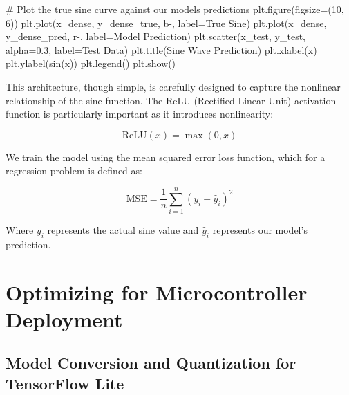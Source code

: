 \documentclass[
  9pt,
  letterpaper,
  abstract,
  titlepage]{scrbook}
\newenvironment{Shaded}{\begin{snugshade}}{\end{snugshade}}
\newcommand{\CommentTok}[1]{\textcolor[rgb]{0.37,0.37,0.37}{#1}}
\newcommand{\DecValTok}[1]{\textcolor[rgb]{0.68,0.00,0.00}{#1}}
\newcommand{\FloatTok}[1]{\textcolor[rgb]{0.68,0.00,0.00}{#1}}
\newcommand{\NormalTok}[1]{\textcolor[rgb]{0.00,0.23,0.31}{#1}}
\newcommand{\OperatorTok}[1]{\textcolor[rgb]{0.37,0.37,0.37}{#1}}
\newcommand{\StringTok}[1]{\textcolor[rgb]{0.13,0.47,0.30}{#1}}
\begin{document}
\begin{Shaded}
\begin{Highlighting}[]
\CommentTok{\# Plot the true sine curve against our model\textquotesingle{}s predictions}
\NormalTok{plt.figure(figsize}\OperatorTok{=}\NormalTok{(}\DecValTok{10}\NormalTok{, }\DecValTok{6}\NormalTok{))}
\NormalTok{plt.plot(x\_dense, y\_dense\_true, }\StringTok{\textquotesingle{}b{-}\textquotesingle{}}\NormalTok{, label}\OperatorTok{=}\StringTok{\textquotesingle{}True Sine\textquotesingle{}}\NormalTok{)}
\NormalTok{plt.plot(x\_dense, y\_dense\_pred, }\StringTok{\textquotesingle{}r{-}\textquotesingle{}}\NormalTok{, label}\OperatorTok{=}\StringTok{\textquotesingle{}Model Prediction\textquotesingle{}}\NormalTok{)}
\NormalTok{plt.scatter(x\_test, y\_test, alpha}\OperatorTok{=}\FloatTok{0.3}\NormalTok{, label}\OperatorTok{=}\StringTok{\textquotesingle{}Test Data\textquotesingle{}}\NormalTok{)}
\NormalTok{plt.title(}\StringTok{\textquotesingle{}Sine Wave Prediction\textquotesingle{}}\NormalTok{)}
\NormalTok{plt.xlabel(}\StringTok{\textquotesingle{}x\textquotesingle{}}\NormalTok{)}
\NormalTok{plt.ylabel(}\StringTok{\textquotesingle{}sin(x)\textquotesingle{}}\NormalTok{)}
\NormalTok{plt.legend()}
\NormalTok{plt.show()}
\end{Highlighting}
\end{Shaded}

This architecture, though simple, is carefully designed to capture the
nonlinear relationship of the sine function. The ReLU (Rectified Linear
Unit) activation function is particularly important as it introduces
nonlinearity:

\[\text{ReLU}(x) = \max(0, x)\]

We train the model using the mean squared error loss function, which for
a regression problem is defined as:

\[\text{MSE} = \frac{1}{n}\sum_{i=1}^{n}(y_i - \hat{y}_i)^2\]

Where \(y_i\) represents the actual sine value and \(\hat{y}_i\)
represents our model's prediction.

\section{Optimizing for Microcontroller
Deployment}\label{optimizing-for-microcontroller-deployment}

\subsection{Model Conversion and Quantization for TensorFlow
Lite}\label{model-conversion-and-quantization-for-tensorflow-lite}
\end{document}

